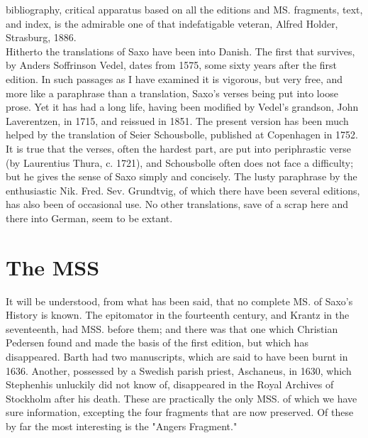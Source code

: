 \documentclass[10pt,a4paper]{report}
\begin{document}
bibliography, critical apparatus based on all the editions and MS. fragments, text, and index, is the admirable one of that indefatigable veteran, Alfred Holder, Strasburg, 1886.\\

Hitherto the translations of Saxo have been into Danish. The first that survives, by Anders Soffrinson Vedel, dates from 1575, some sixty years after the first edition. In such passages as I have examined it is vigorous, but very free, and more like a paraphrase than a translation, Saxo's verses being put into loose prose. Yet it has had a long life, having been modified by Vedel's grandson, John Laverentzen, in 1715, and reissued in 1851. The present version has been much helped by the translation of Seier Schousbolle, published at Copenhagen in 1752. It is true that the verses, often the hardest part, are put into periphrastic verse (by Laurentius Thura, c. 1721), and Schousbolle often does not face a difficulty; but he gives the sense of Saxo simply and concisely. The lusty paraphrase by the enthusiastic Nik. Fred. Sev. Grundtvig, of which there have been several editions, has also been of occasional use. No other translations, save of a scrap here and there into German, seem to be extant.\\

\chapter{The MSS}
It will be understood, from what has been said, that no complete MS. of Saxo's History is known. The epitomator in the fourteenth century, and Krantz in the seventeenth, had MSS. before them; and there was that one which Christian Pedersen found and made the basis of the first edition, but which has disappeared. Barth had two manuscripts, which are said to have been burnt in 1636. Another, possessed by a Swedish parish priest, Aschaneus, in 1630, which Stephenhis unluckily did not know of, disappeared in the Royal Archives of Stockholm after his death. These are practically the only MSS. of which we have sure information, excepting the four fragments that are now preserved. Of these by far the most interesting is the "Angers Fragment."\\
\end{document}
